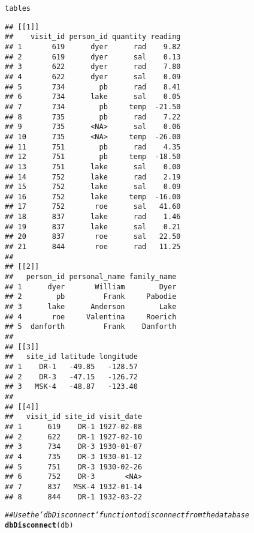 \documentclass{article}\usepackage[]{graphicx}\usepackage[]{xcolor}
\makeatletter
\newcommand{\hlcom}[1]{\textcolor[rgb]{0.678,0.584,0.686}{\textit{#1}}}%
\newcommand{\hlstd}[1]{\textcolor[rgb]{0.345,0.345,0.345}{#1}}%
\newcommand{\hlkwd}[1]{\textcolor[rgb]{0.737,0.353,0.396}{\textbf{#1}}}%
\newenvironment{kframe}{%
 \def\at@end@of@kframe{}%
 \ifinner\ifhmode%
  \def\at@end@of@kframe{\end{minipage}}%
  \begin{minipage}{\columnwidth}%
 \fi\fi%
 \def\FrameCommand##1{\hskip\@totalleftmargin \hskip-\fboxsep
 \colorbox{shadecolor}{##1}\hskip-\fboxsep
     \hskip-\linewidth \hskip-\@totalleftmargin \hskip\columnwidth}%
 \MakeFramed {\advance\hsize-\width
   \@totalleftmargin\z@ \linewidth\hsize
   \@setminipage}}%
 {\par\unskip\endMakeFramed%
 \at@end@of@kframe}
\newenvironment{knitrout}{}{} %
\makeatother
\begin{document}
\begin{knitrout}
\begin{kframe}
{\ttfamily\noindent\color{warningcolor}{\#\# Warning in result\_fetch(res@ptr, n = n): Column `reading`: mixed type, first seen values of type real, coercing other values of type string}}\begin{alltt}
\hlstd{tables}
\end{alltt}
\begin{verbatim}
## [[1]]
##    visit_id person_id quantity reading
## 1       619      dyer      rad    9.82
## 2       619      dyer      sal    0.13
## 3       622      dyer      rad    7.80
## 4       622      dyer      sal    0.09
## 5       734        pb      rad    8.41
## 6       734      lake      sal    0.05
## 7       734        pb     temp  -21.50
## 8       735        pb      rad    7.22
## 9       735      <NA>      sal    0.06
## 10      735      <NA>     temp  -26.00
## 11      751        pb      rad    4.35
## 12      751        pb     temp  -18.50
## 13      751      lake      sal    0.00
## 14      752      lake      rad    2.19
## 15      752      lake      sal    0.09
## 16      752      lake     temp  -16.00
## 17      752       roe      sal   41.60
## 18      837      lake      rad    1.46
## 19      837      lake      sal    0.21
## 20      837       roe      sal   22.50
## 21      844       roe      rad   11.25
## 
## [[2]]
##   person_id personal_name family_name
## 1      dyer       William        Dyer
## 2        pb         Frank     Pabodie
## 3      lake      Anderson        Lake
## 4       roe     Valentina     Roerich
## 5  danforth         Frank    Danforth
## 
## [[3]]
##   site_id latitude longitude
## 1    DR-1   -49.85   -128.57
## 2    DR-3   -47.15   -126.72
## 3   MSK-4   -48.87   -123.40
## 
## [[4]]
##   visit_id site_id visit_date
## 1      619    DR-1 1927-02-08
## 2      622    DR-1 1927-02-10
## 3      734    DR-3 1930-01-07
## 4      735    DR-3 1930-01-12
## 5      751    DR-3 1930-02-26
## 6      752    DR-3       <NA>
## 7      837   MSK-4 1932-01-14
## 8      844    DR-1 1932-03-22
\end{verbatim}
\begin{alltt}
\hlcom{## Use the `dbDisconnect` function to disconnect from the database}
\hlkwd{dbDisconnect}\hlstd{(db)}


\end{alltt}
\end{kframe}
\end{knitrout}
\end{document}
